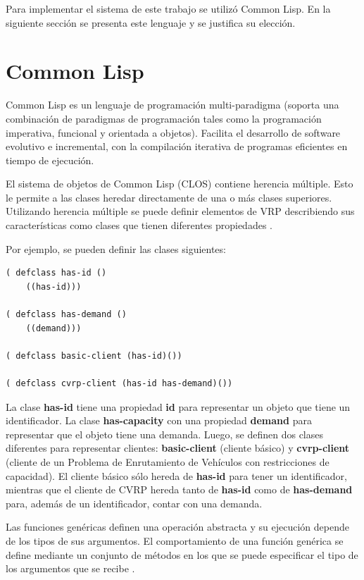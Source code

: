 Para implementar el sistema de este trabajo se utilizó Common Lisp. En la siguiente sección se presenta este lenguaje y se justifica su elección.

\section{Common Lisp}\label{1-Lisp}
Common Lisp es un lenguaje de programación multi-paradigma (soporta una combinación de paradigmas de programación tales como la programación imperativa, funcional y orientada a objetos). Facilita el desarrollo de software evolutivo e incremental, con la compilación iterativa de programas eficientes en tiempo de ejecución. \cite{TODO}


El sistema de objetos de Common Lisp (CLOS) contiene herencia múltiple. Esto le permite a las clases heredar directamente de una o más clases superiores. Utilizando herencia múltiple se puede definir elementos de VRP describiendo sus características como clases que tienen diferentes propiedades \cite{TODO}.

Por ejemplo, se pueden definir las clases siguientes:

\begin{lstlisting}
( defclass has-id ()
	((has-id)))

( defclass has-demand ()
	((demand)))

( defclass basic-client (has-id)())

( defclass cvrp-client (has-id has-demand)())
\end{lstlisting}

La clase \textbf{has-id} tiene una propiedad \textbf{id} para representar un objeto que tiene un identificador. La clase \textbf{has-capacity} con una propiedad \textbf{demand} para representar que el objeto tiene una demanda. Luego, se definen dos clases diferentes para representar clientes: \textbf{basic-client} (cliente básico) y \textbf{cvrp-client} (cliente de un Problema de Enrutamiento de Vehículos con restricciones de capacidad). El cliente básico sólo hereda de \textbf{has-id} para tener un identificador, mientras que el cliente de CVRP hereda tanto de \textbf{has-id} como de \textbf{has-demand} para, además de un identificador, contar con una demanda.

Las funciones genéricas definen una operación abstracta y su ejecución depende de los tipos de sus argumentos. El comportamiento de una función genérica se define mediante un conjunto de métodos en los que se puede especificar el tipo de los argumentos que se recibe \cite{TODO}.

